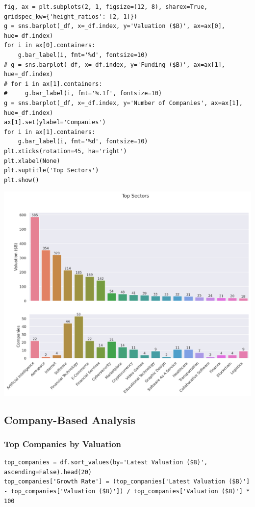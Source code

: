 \documentclass[a4paper,12pt]{article}
\begin{document}
\begin{verbatim}
fig, ax = plt.subplots(2, 1, figsize=(12, 8), sharex=True, gridspec_kw={'height_ratios': [2, 1]})
g = sns.barplot(_df, x=_df.index, y='Valuation ($B)', ax=ax[0], hue=_df.index)
for i in ax[0].containers:
    g.bar_label(i, fmt='%d', fontsize=10)
# g = sns.barplot(_df, x=_df.index, y='Funding ($B)', ax=ax[1], hue=_df.index)
# for i in ax[1].containers:
#     g.bar_label(i, fmt='%.1f', fontsize=10)
g = sns.barplot(_df, x=_df.index, y='Number of Companies', ax=ax[1], hue=_df.index)
ax[1].set(ylabel='Companies')
for i in ax[1].containers:
    g.bar_label(i, fmt='%d', fontsize=10)
plt.xticks(rotation=45, ha='right')
plt.xlabel(None)
plt.suptitle('Top Sectors')
plt.show()
\end{verbatim}

\begin{center}
\includegraphics[width=.9\linewidth]{./.ob-jupyter/8c900de15d8f038ec9cee86aad5d7978e4f44f15.png}
\label{}
\end{center}
\subsection{Company-Based Analysis}
\label{sec:org41b8dfd}
\subsubsection{Top Companies by Valuation}
\label{sec:orgbf0b300}

\begin{verbatim}
top_companies = df.sort_values(by='Latest Valuation ($B)', ascending=False).head(20)
top_companies['Growth Rate'] = (top_companies['Latest Valuation ($B)'] - top_companies['Valuation ($B)']) / top_companies['Valuation ($B)'] * 100
\end{verbatim}
\end{document}

